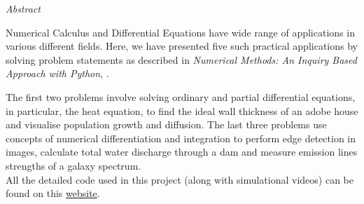\pagebreak

\vspace*{\fill}

\begin{center}
  {\huge{\textit{Abstract}} }
\end{center}
\vspace{1cm}
\begin{spacing}{1.25}{\large 
\noindent Numerical Calculus and Differential Equations have wide range of applications in various different fields. Here, we have presented five such practical applications by solving problem statements as described in \textit{Numerical Methods: An Inquiry Based Approach with Python}, \cite{sullivan-2020}.

The first two problems involve solving ordinary and partial differential equations, in particular, the heat equation, to find the ideal wall thickness of an adobe house and visualise population growth and diffusion.
The last three problems use concepts of numerical differentiation and integration to perform edge detection in images, calculate total water discharge through a dam and measure emission lines strengths of a galaxy spectrum.\\

\noindent All the detailed code used in this project (along with simulational videos) can be found on this \href{https://gayatri-p.github.io/p346-computational-physics/}{website}.
}\end{spacing}

\vspace*{\fill}
\pagebreak